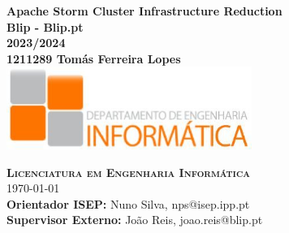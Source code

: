 \begin{center}

    \center

    {\huge \bfseries Apache Storm Cluster Infrastructure Reduction}\\[.5cm]

    {\bfseries Blip - Blip.pt }\\[1cm]

    {\Large \bfseries 2023/2024}\\[2cm]

    {\Large\bf 1211289 Tomás Ferreira Lopes }\\[2.5cm]


    \includegraphics[width=8cm, keepaspectratio]{media/isep/dei.png}

    \vfill

    \textsc{
        \Large \bfseries Licenciatura em Engenharia Informática
    }
    \HRuleFront
    \\[.5cm]

    {\Large \monthyeardate\today}\\[1cm]

    {{\small\bf Orientador ISEP:  } {\small Nuno Silva, nps@isep.ipp.pt}} \\[4pt]
    {{\small\bf Supervisor Externo:} {\small João Reis, joao.reis@blip.pt}} \\[4pt]

\end{center}
